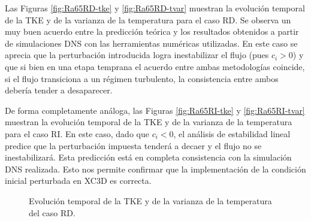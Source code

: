 Las Figuras \ref{fig:Ra65RD-tke} y \ref{fig:Ra65RD-tvar} muestran la evolución temporal de la TKE y de la varianza de la temperatura para el caso RD. Se observa un muy buen acuerdo entre la predicción teórica y los resultados obtenidos a partir de simulaciones DNS con las herramientas numéricas utilizadas. En este caso se aprecia que la perturbación introducida logra inestabilizar el flujo (pues $c_i>0$) y que si bien en una etapa temprana el acuerdo entre ambas metodologías coincide, si el flujo transiciona a un régimen turbulento, la consistencia entre ambos debería tender a desaparecer.  

De forma completamente análoga, las Figuras \ref{fig:Ra65RI-tke} y \ref{fig:Ra65RI-tvar} muestran la evolución temporal de la TKE y de la varianza de la temperatura para el caso RI. En este caso, dado que $c_i<0$, el análisis de estabilidad lineal predice que la perturbación impuesta tenderá a decaer y el flujo no se inestabilizará. Esta predicción está en completa consistencia con la simulación DNS realizada. Esto nos permite confirmar que la implementación de la condición inicial perturbada en XC3D es correcta.  

\begin{figure}[H]
 \centering
 \caption{Evolución temporal de la TKE y de la varianza de la temperatura del caso RD.} 
 \label{fig:Ra65R-DI}
\end{figure}

